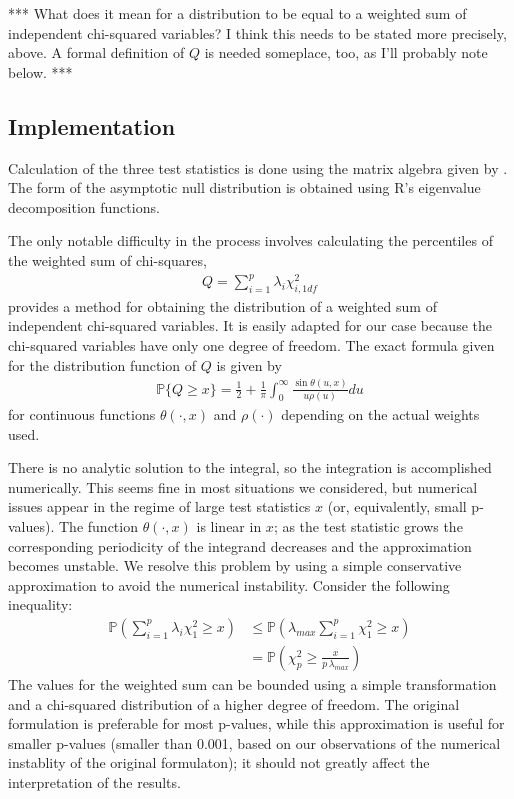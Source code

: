 *** What does it mean for a distribution to be equal to a weighted sum of
independent chi-squared variables?  I think this needs to be stated more
precisely, above.  A formal definition of $Q$ is needed someplace, too,
as I'll probably note below. ***

\subsection{Implementation}

Calculation of the three test statistics is done using the
matrix algebra given by \cite{choulakian1994}. The form of the
asymptotic null distribution is obtained using R's
eigenvalue decomposition functions. 

The only notable difficulty in the process involves calculating the percentiles
of the weighted sum of chi-squares,
\begin{align}
Q = \sum_{i=1}^{p} \lambda_i \chi^2_{i,1df}
\end{align}
\cite{imhof1961} provides a method for obtaining the distribution of
a weighted sum of independent chi-squared variables.  It is
easily adapted for our case because
the chi-squared variables have only one degree of freedom.
The exact formula given for the distribution function of $Q$
is given by
\begin{align}
\mathbb{P}\{Q \geq x \} = \frac{1}{2} + 
\frac{1}{\pi} \int_{0}^{\infty} \frac{\sin\theta(u,x)}{u \rho(u) } du
\end{align}
for continuous functions $\theta(\cdot, x)$ and $\rho(\cdot)$ depending on the actual weights used. 

There is no analytic solution to the integral, so the integration is
accomplished numerically. This seems fine in most situations we considered,
but numerical issues appear in the regime of large test statistics $x$
(or, equivalently, small p-values).
The function $\theta(\cdot, x)$ is linear in $x$; as the test statistic 
grows the corresponding periodicity of the integrand decreases and
the approximation becomes unstable. 
We resolve this problem by using a simple conservative approximation to
avoid the numerical instability. Consider the
following inequality:
\begin{align}
\mathbb{P} \left(\sum_{i=1}^{p} \lambda_i \chi^2_1 \geq x \right) &\leq \mathbb{P} \left( \lambda_{max} \sum_{i=1}^{p} \chi^2_1 \geq x \right) \\
&= \mathbb{P} \left(\chi^2_p \geq \frac{x}{p \, \lambda_{max}} \right)
\end{align}
The values for the weighted sum can be bounded using a simple transformation
and a chi-squared distribution of a higher degree of freedom. 
The original formulation is preferable for most p-values, while
this approximation is useful for smaller p-values (smaller than 0.001,
based on our observations of the numerical instablity of the original
formulaton); it should not greatly affect the interpretation of the results.

